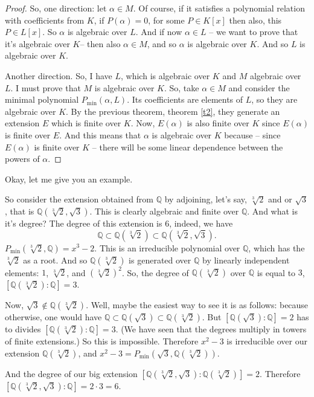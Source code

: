 \begin{proof}
So, one direction: let $\alpha\in M$. Of course, if it satisfies a polynomial relation with coefficients from $K$, if $P(\alpha) = 0$, for some $P \in K[x]$ then also, this $P \in L[x]$. So $\alpha$ is algebraic over $L$. And if now $\alpha \in L$ -- we want to prove that it's algebraic over $K$-- then also $\alpha \in M$, and so $\alpha$ is algebraic over $K$. And so $L$ is algebraic over $K$. 

Another direction. So, I have $L$, which is algebraic over $K$ and $M$ algebraic over $L$. I must prove that $M$ is algebraic over $K$. So, take $\alpha \in M$ and consider the minimal polynomial $P_{\text{min}}(\alpha,L)$. Its coefficients are elements of $L$, so they are algebraic over $K$. By the previous theorem, theorem \ref{t2}, they generate an extension $E$ which is finite over $K$. Now, $E(\alpha)$ is also finite over $K$ since $E(\alpha)$ is finite over $E$. And this means that $\alpha$ is algebraic over $K$ because -- since $E(\alpha)$ is finite over $K$ -- there will be some linear dependence between the powers of $\alpha$. 
\end{proof}

Okay, let me give you an example. 
\begin{example}
So consider the extension obtained from $\mathbb{Q}$ by adjoining, let's say, $\sqrt[3]{2}$ and or $\sqrt{3}$, that is $\mathbb{Q}(\sqrt[3]{2},\sqrt{3})$. This is clearly algebraic and finite over $\mathbb{Q}$. And what is it's degree? The degree of this extension is 6, indeed, we have
\begin{equation}
\mathbb{Q} \subset \mathbb{Q}(\sqrt[3]{2}) \subset \mathbb{Q}(\sqrt[3]{2},\sqrt{3}).
\end{equation}
$P_{\text{min}}(\sqrt[3]{2},\mathbb{Q})=x^3-2$. This is an irreducible polynomial over $\mathbb{Q}$, which has the $\sqrt[3]{2}$ as a root. And so $\mathbb{Q}(\sqrt[3]{2})$ is generated over $\mathbb{Q}$ by linearly independent elements: $1$, $\sqrt[3]{2}$, and $(\sqrt[3]{2})^2$. So, the degree of $\mathbb{Q}(\sqrt[3]{2})$ over $\mathbb{Q}$ is equal to $3$, $\left[\mathbb{Q}(\sqrt[3]{2}):\mathbb{Q}\right]=3$.

Now, $\sqrt{3} \notin \mathbb{Q}(\sqrt[3]{2})$. Well, maybe the easiest way to see it is as follows: because otherwise, one would have $\mathbb{Q} \subset \mathbb{Q}(\sqrt{3}) \subset \mathbb{Q}(\sqrt[3]{2})$. But $\left[\mathbb{Q}(\sqrt{3}):\mathbb{Q}\right]=2$ has to divides $\left[\mathbb{Q}(\sqrt[3]{2}):\mathbb{Q}\right]=3$. (We have seen that the degrees multiply in towers of finite extensions.) So this is impossible. Therefore $x^2 -3$ is irreducible over our extension $\mathbb{Q}(\sqrt[3]{2})$, and $x^2 -3= P_{\text{min}}(\sqrt{3},\mathbb{Q}(\sqrt[3]{2}))$. 

And the degree of our big extension $\left[\mathbb{Q}(\sqrt[3]{2},\sqrt{3}):\mathbb{Q}(\sqrt[3]{2})\right]=2$. Therefore $\left[\mathbb{Q}(\sqrt[3]{2},\sqrt{3}):\mathbb{Q}\right]=2 \cdot 3 = 6$. 
\end{example}

